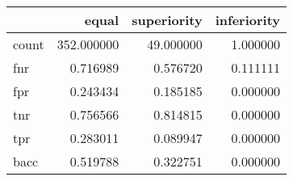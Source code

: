 \begin{tabular}{lrrr}
\toprule
{} &       equal &  superiority &  inferiority \\
\midrule
count &  352.000000 &    49.000000 &     1.000000 \\
fnr   &    0.716989 &     0.576720 &     0.111111 \\
fpr   &    0.243434 &     0.185185 &     0.000000 \\
tnr   &    0.756566 &     0.814815 &     0.000000 \\
tpr   &    0.283011 &     0.089947 &     0.000000 \\
bacc  &    0.519788 &     0.322751 &     0.000000 \\
\bottomrule
\end{tabular}
